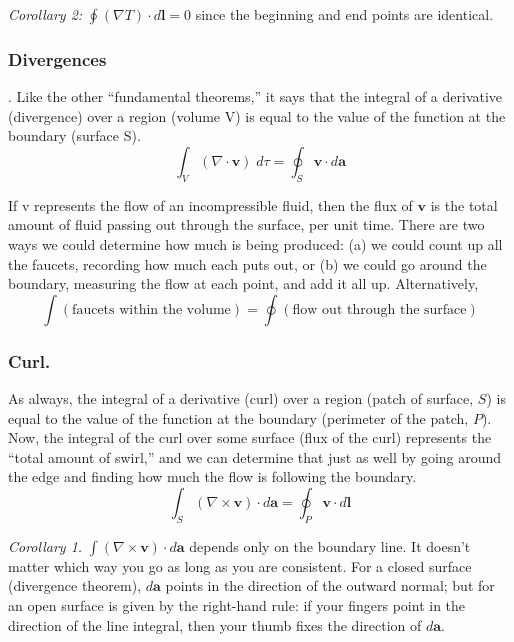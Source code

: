 \documentclass[../../../main.tex]{subfiles}
\begin{document}
\emph{Corollary 2:} $\oint (\nabla T)\cdot d\mathbf{l}=0 $ since the beginning and end points are identical.

\subsubsection{Divergences}.
Like the other “fundamental theorems,” it says that the integral of a derivative (divergence) over a region (volume V) is equal to the value of the function at the boundary (surface S).
\begin{equation*}
    \int_{V}(\nabla \cdot \mathbf{v})\;d\tau=\oint_{S}\mathbf{v}\cdot d\mathbf{a}
\end{equation*}

If v represents the flow of an incompressible fluid, then the flux of $\mathbf{v}$ is the total amount of fluid passing out through the surface, per unit time.  There are two ways we could determine how much is being produced: (a) we could count up all the faucets, recording how much each puts out, or (b) we could go around the boundary, measuring the ﬂow at each point, and add it all up. Alternatively,
\begin{equation*}
    \int (\text{faucets within the volume})=\oint (\text{ﬂow out through the surface})
\end{equation*}

\subsubsection{Curl.} As always, the integral of a derivative (curl) over a region (patch of surface, $S$) is equal to the value of the function at the boundary (perimeter of the patch, $P$). Now, the integral of the curl over some surface (flux of the curl) represents the “total amount of swirl,” and we can determine that just as well by going around the edge and finding how much the flow is following the boundary.
\begin{equation*}
    \int_{S}(\nabla \times \mathbf{v})\cdot d\mathbf{a}=\oint_{P}\mathbf{v}\cdot d\mathbf{l}
\end{equation*}

\emph{Corollary 1.} $\int (\nabla \times \mathbf{v})\cdot d\mathbf{a}$ depends only on the boundary line. It doesn't matter which way you go as long as you are consistent. For a closed surface (divergence theorem), $d\mathbf{a}$ points in the direction of the outward normal; but for an open surface is given by the right-hand rule: if your ﬁngers point in the direction of the line integral, then your thumb ﬁxes the direction of $d\mathbf{a}$.
\end{document}
